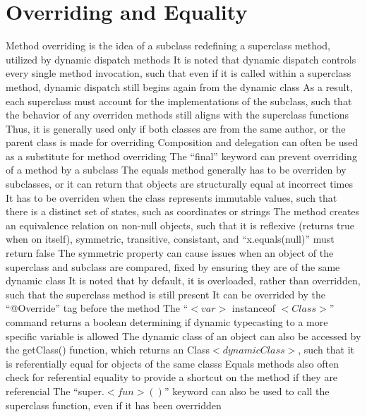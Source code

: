 \documentclass[11 pt, twoside]{article}
\newenvironment{outline*}
{
	\begin{outline}[enumerate]
	}
	{\end{outline}
}
\begin{document}
\section{Overriding and Equality}
\begin{outline*}
\1 Method overriding is the idea of a subclass redefining a superclass method, utilized by dynamic dispatch methods
	\2 It is noted that dynamic dispatch controls every single method invocation, such that even if it is called within a superclass method, dynamic dispatch still begins again from the dynamic class
	\2 As a result, each superclass must account for the implementations of the subclass, such that the behavior of any overriden methods still aligns with the superclass functions
		\3 Thus, it is generally used only if both classes are from the same author, or the parent class is made for overriding
		\3 Composition and delegation can often be used as a substitute for method overriding
	\2 The ``final'' keyword can prevent overriding of a method by a subclass
\1 The equals method generally has to be overriden by subclasses, or it can return that objects are structurally equal at incorrect times
	\2 It has to be overriden when the class represents immutable values, such that there is a distinct set of states, such as coordinates or strings
	\2 The method creates an equivalence relation on non-null objects, such that it is reflexive (returns true when on itself), symmetric, transitive, consistant, and ``x.equals(null)'' must return false
		\3 The symmetric property can cause issues when an object of the superclass and subclass are compared, fixed by ensuring they are of the same dynamic class
	\2 It is noted that by default, it is overloaded, rather than overridden, such that the superclass method is still present
		\3 It can be overrided by the ``@Override'' tag before the method
		\3 The ``$<var>$ instanceof $<Class>$'' command returns a boolean determining if dynamic typecasting to a more specific variable is allowed
		\3 The dynamic class of an object can also be accessed by the getClass() function, which returns an Class$<dynamicClass>$, such that it is referentially equal for objects of the same classs
	\2 Equals methods also often check for referential equality to provide a shortcut on the method if they are referencial
	\2 The ``super.$<fun>()$'' keyword can also be used to call the superclass function, even if it has been overridden
\end{outline*}
\end{document}
